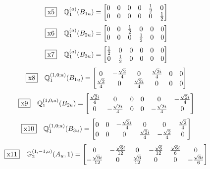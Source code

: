 \documentclass[fleqn,10pt,landscape]{jsarticle}
\begin{document}
\begin{dmath*}
\fbox{x5}\quad \mathbb{Q}_{1}^{(a)}(B_{1u})=\begin{bmatrix} 0 & 0 & 0 & 0 & \frac{1}{2} & 0 \\ 0 & 0 & 0 & 0 & 0 & \frac{1}{2} \end{bmatrix}
\end{dmath*}
\begin{dmath*}
\fbox{x6}\quad \mathbb{Q}_{1}^{(a)}(B_{2u})=\begin{bmatrix} 0 & 0 & \frac{1}{2} & 0 & 0 & 0 \\ 0 & 0 & 0 & \frac{1}{2} & 0 & 0 \end{bmatrix}
\end{dmath*}
\begin{dmath*}
\fbox{x7}\quad \mathbb{Q}_{1}^{(a)}(B_{3u})=\begin{bmatrix} \frac{1}{2} & 0 & 0 & 0 & 0 & 0 \\ 0 & \frac{1}{2} & 0 & 0 & 0 & 0 \end{bmatrix}
\end{dmath*}
\begin{dmath*}
\fbox{x8}\quad \mathbb{Q}_{1}^{(1,0;a)}(B_{1u})=\begin{bmatrix} 0 & - \frac{\sqrt{2}}{4} & 0 & \frac{\sqrt{2} i}{4} & 0 & 0 \\ \frac{\sqrt{2}}{4} & 0 & \frac{\sqrt{2} i}{4} & 0 & 0 & 0 \end{bmatrix}
\end{dmath*}
\begin{dmath*}
\fbox{x9}\quad \mathbb{Q}_{1}^{(1,0;a)}(B_{2u})=\begin{bmatrix} \frac{\sqrt{2} i}{4} & 0 & 0 & 0 & 0 & - \frac{\sqrt{2} i}{4} \\ 0 & - \frac{\sqrt{2} i}{4} & 0 & 0 & - \frac{\sqrt{2} i}{4} & 0 \end{bmatrix}
\end{dmath*}
\begin{dmath*}
\fbox{x10}\quad \mathbb{Q}_{1}^{(1,0;a)}(B_{3u})=\begin{bmatrix} 0 & 0 & - \frac{\sqrt{2} i}{4} & 0 & 0 & \frac{\sqrt{2}}{4} \\ 0 & 0 & 0 & \frac{\sqrt{2} i}{4} & - \frac{\sqrt{2}}{4} & 0 \end{bmatrix}
\end{dmath*}
\begin{dmath*}
\fbox{x11}\quad \mathbb{G}_{2}^{(1,-1;a)}(A_{u},1)=\begin{bmatrix} 0 & - \frac{\sqrt{6} i}{12} & 0 & - \frac{\sqrt{6}}{12} & \frac{\sqrt{6} i}{6} & 0 \\ - \frac{\sqrt{6} i}{12} & 0 & \frac{\sqrt{6}}{12} & 0 & 0 & - \frac{\sqrt{6} i}{6} \end{bmatrix}
\end{dmath*}
\end{document}
